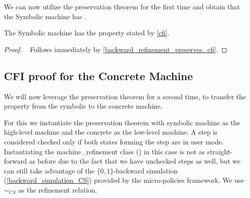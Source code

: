 We can now utilize the preservation theorem for the first time and
obtain that the Symbolic machine has \CFI.

\begin{theorem}\label{CFIsymbolic}
The Symbolic machine has the \CFI property stated by \cref{cfi}.
\end{theorem}
\begin{proof}
  ~ Follows immediately by \cref{backward_refinement_preserves_cfi}.
\end{proof}


\subsection{CFI proof for the Concrete Machine}
\label{sec:concrete_proof}

We will now leverage the preservation theorem for a second time,
to transfer the \CFI property from the symbolic to the concrete
machine. 

For this we instantiate the preservation theorem with symbolic machine
as the high-level machine and the concrete as the low-level machine. A
step is considered checked only if both states forming the step are in
user mode. Instantiating the machine\_refinement class
() in this case is not as
straight-forward as before due to the fact that we have unchecked
steps as well, but we can still take advantage of the $\lbrace 0,1
\rbrace$-backward simulation (\cref{backward_simulation_CS}) provided
by the micro-policies framework. We use $\sim_{CS}$ as the refinement
relation.

